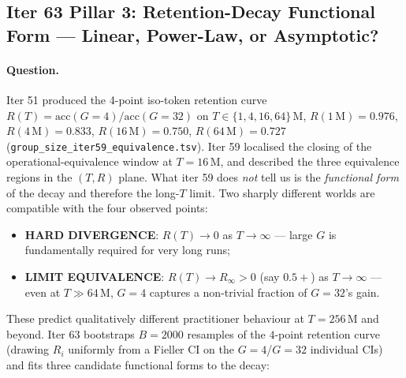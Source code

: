 \subsection{Iter 63 Pillar 3: Retention-Decay Functional Form --- Linear, Power-Law, or Asymptotic?}
\label{sec:group-size-iter63}

\paragraph{Question.}
Iter 51 produced the 4-point iso-token retention curve
$R(T) = \mathrm{acc}(G{=}4)/\mathrm{acc}(G{=}32)$ on
$T \in \{1, 4, 16, 64\}\,\mathrm{M}$,
$R(1\,\mathrm{M}) = 0.976$,
$R(4\,\mathrm{M}) = 0.833$,
$R(16\,\mathrm{M}) = 0.750$,
$R(64\,\mathrm{M}) = 0.727$
(\texttt{group\_size\_iter59\_equivalence.tsv}).  Iter 59 localised
the closing of the operational-equivalence window at $T = 16\,\mathrm{M}$,
and described the three equivalence regions in the $(T, R)$ plane.
What iter 59 does \emph{not} tell us is the \emph{functional form}
of the decay and therefore the long-$T$ limit.  Two sharply different
worlds are compatible with the four observed points:

\begin{itemize}
  \item \textbf{HARD DIVERGENCE}: $R(T) \to 0$ as $T \to \infty$ — large $G$ is fundamentally required for very long runs;
  \item \textbf{LIMIT EQUIVALENCE}: $R(T) \to R_\infty > 0$ (say $0.5{+}$) as $T \to \infty$ — even at $T \gg 64\,\mathrm{M}$, $G{=}4$ captures a non-trivial fraction of $G{=}32$'s gain.
\end{itemize}

These predict qualitatively different practitioner behaviour at
$T = 256\,\mathrm{M}$ and beyond.  Iter 63 bootstraps $B = 2000$
resamples of the $4$-point retention curve (drawing $R_i$ uniformly
from a Fieller CI on the $G{=}4$/$G{=}32$ individual CIs) and fits
three candidate functional forms to the decay:

